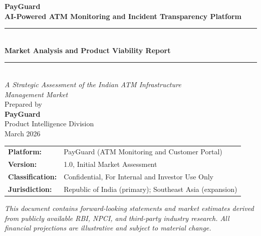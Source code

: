 \documentclass[12pt,a4paper]{article}
\begin{document}
\begin{titlepage}
  \thispagestyle{empty}
  \begin{center}
    \vspace*{2cm}

    {\Huge\bfseries PayGuard}\\[0.4cm]
    {\large\bfseries AI-Powered ATM Monitoring and Incident Transparency Platform}\\[1.2cm]

    \rule{\linewidth}{1pt}\\[0.5cm]
    {\LARGE\bfseries Market Analysis and Product Viability Report}\\[0.3cm]
    \rule{\linewidth}{1pt}\\[1.0cm]

    {\large\itshape A Strategic Assessment of the Indian ATM Infrastructure\\
    Management Market}\\[2.5cm]

    {\large Prepared by}\\[0.3cm]
    {\Large\bfseries PayGuard}\\[0.2cm]
    {\normalsize Product Intelligence Division}\\[2.0cm]

    {\large March 2026}\\[3.0cm]

    \begin{tabular}{l l}
      \textbf{Platform:}       & PayGuard (ATM Monitoring and Customer Portal) \\
      \textbf{Version:}        & 1.0, Initial Market Assessment \\
      \textbf{Classification:} & Confidential, For Internal and Investor Use Only \\
      \textbf{Jurisdiction:}   & Republic of India (primary); Southeast Asia (expansion) \\
    \end{tabular}

    \vfill
    {\small\itshape This document contains forward-looking statements and market estimates
    derived from publicly available RBI, NPCI, and third-party industry research.
    All financial projections are illustrative and subject to material change.}
  \end{center}
\end{titlepage}

\newpage
\thispagestyle{fancy}
\end{document}
